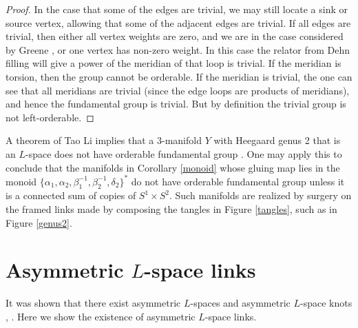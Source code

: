 \documentclass{amsart}
\theoremstyle{definition}
\theoremstyle{remark}
\begin{document}
\begin{proof}
In the case that some of the edges are trivial, we may still locate a sink or source vertex, allowing that some of the adjacent edges are trivial. If all edges are trivial, then either all vertex weights are zero, and we are in the case considered by Greene \cite{MR3778170}, or one vertex has non-zero weight. In this case the relator from Dehn filling will give a power of the meridian of that loop is trivial. If the meridian is torsion, then the group cannot be orderable. If the meridian is trivial, the one can see that all meridians are trivial (since the edge loops are products of meridians), and hence the fundamental group is trivial. But by definition the trivial group is not left-orderable. 
\end{proof}


A theorem of Tao Li implies that a 3-manifold $Y$ with Heegaard genus 2 that is an $L$-space does not have orderable fundamental group \cite[Theorem 1.2]{li2022taut}. One may apply this to conclude that the manifolds in Corollary \ref{monoid} whose gluing map lies in the monoid $\{\alpha_1, \alpha_2, \beta_1^{-1},\beta_2^{-1},\delta_2\}^*$ do not have orderable fundamental group unless it is a connected sum of copies of $S^1\times S^2$. Such manifolds are realized by surgery on the framed links made by composing the tangles in Figure \ref{tangles}, such as in Figure \ref{genus2}. 

\section{Asymmetric $L$-space links}
It was shown that there exist asymmetric $L$-spaces and asymmetric $L$-space knots \cite[Theorem 1.2]{MR3507256}, \cite{MR4194294}. Here we show the existence of asymmetric $L$-space links. 
\end{document}
